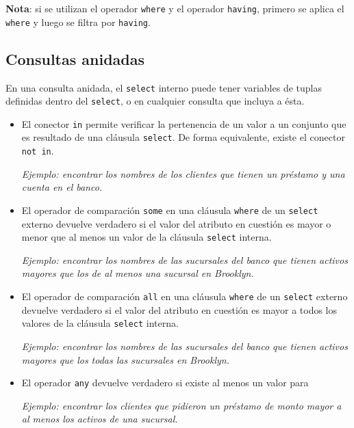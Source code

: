 \documentclass[a4paper, twoside]{article}
\newcommand{\codedir}{../resources/code} %
\begin{document}
\textbf{Nota}: si se utilizan el operador \texttt{where} y el operador \texttt{having}, primero se aplica el \texttt{where} y luego se filtra por \texttt{having}.

\subsection{Consultas anidadas}
En una consulta anidada, el \texttt{select} interno puede tener variables de tuplas definidas dentro del \texttt{select}, o en cualquier consulta que incluya a ésta.
\begin{itemize}
	\item El conector \texttt{in} permite verificar la pertenencia de un valor a un conjunto que es resultado de una cláusula \texttt{select}. De forma equivalente, existe el conector \texttt{not in}.

	\emph{Ejemplo: encontrar los nombres de los clientes que tienen un préstamo y una cuenta en el banco.}

	

	\item El operador de comparación \texttt{some} en una cláusula \texttt{where} de un \texttt{select} externo devuelve verdadero si el valor del atributo en cuestión es mayor o menor que al menos un valor de la cláusula
\texttt{select} interna.

	\emph{Ejemplo: encontrar los nombres de las sucursales del banco que tienen activos mayores que los de al menos una sucursal en Brooklyn.}

	

	\item El operador de comparación \texttt{all} en una cláusula \texttt{where} de un \texttt{select} externo devuelve verdadero si el valor del atributo en cuestión es mayor a todos los valores de la cláusula \texttt{select}
interna.

	\emph{Ejemplo: encontrar los nombres de las sucursales del banco que tienen activos mayores que los todas las sucursales en Brooklyn.}

	

	\item El operador \texttt{any} devuelve verdadero si existe al menos un valor para

	\emph{Ejemplo: encontrar los clientes que pidieron un préstamo de monto mayor a al menos los activos de una sucursal.}


\end{itemize}
\end{document}
